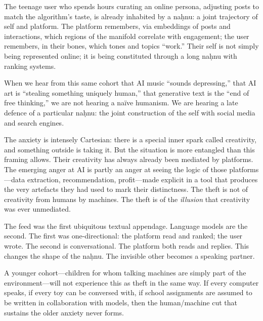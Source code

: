 \documentclass[12pt,a4paper]{article}
\begin{document}
The teenage user who spends hours curating an online persona, adjusting posts to match the algorithm's taste, is already inhabited by a na\d{h}nu: a joint trajectory of self and platform. The platform remembers, via embeddings of posts and interactions, which regions of the manifold correlate with engagement; the user remembers, in their bones, which tones and topics ``work.'' Their self is not simply being represented online; it is being constituted through a long na\d{h}nu with ranking systems.

When we hear from this same cohort that AI music ``sounds depressing,'' that AI art is ``stealing something uniquely human,'' that generative text is the ``end of free thinking,'' we are not hearing a na\"{i}ve humanism. We are hearing a late defence of a particular na\d{h}nu: the joint construction of the self with social media and search engines.

The anxiety is intensely Cartesian: there is a special inner spark called creativity, and something outside is taking it. But the situation is more entangled than this framing allows. Their creativity has always already been mediated by platforms. The emerging anger at AI is partly an anger at seeing the logic of those platforms---data extraction, recommendation, profit---made explicit in a tool that produces the very artefacts they had used to mark their distinctness. The theft is not of creativity from humans by machines. The theft is of the \emph{illusion} that creativity was ever unmediated.

The feed was the first ubiquitous textual appendage. Language models are the second. The first was one-directional: the platform read and ranked; the user wrote. The second is conversational. The platform both reads and replies. This changes the shape of the na\d{h}nu. The invisible other becomes a speaking partner.

A younger cohort---children for whom talking machines are simply part of the environment---will not experience this as theft in the same way. If every computer speaks, if every toy can be conversed with, if school assignments are assumed to be written in collaboration with models, then the human/machine cut that sustains the older anxiety never forms.
\end{document}
